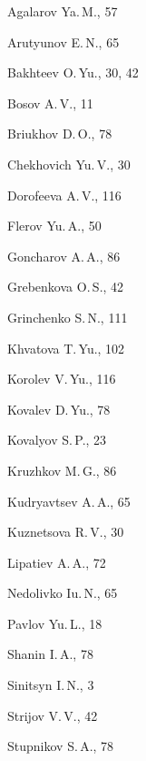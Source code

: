 \begin{theindex}

  \item Agalarov Ya.\,M., 57
  \item Arutyunov E.\,N., 65

  \indexspace

  \item Bakhteev O.\,Yu., 30, 42
  \item Bosov A.\,V., 11
  \item Briukhov D.\,O., 78

  \indexspace

  \item Chekhovich Yu.\,V., 30

  \indexspace

  \item Dorofeeva A.\,V., 116

  \indexspace

  \item Flerov Yu.\,A., 50

  \indexspace

  \item Goncharov A.\,A., 86
  \item Grebenkova O.\,S., 42
  \item Grinchenko S.\,N., 111

  \indexspace

  \item Khvatova T.\,Yu., 102
  \item Korolev V.\,Yu., 116
  \item Kovalev D.\,Yu., 78
  \item Kovalyov S.\,P., 23
  \item Kruzhkov M.\,G., 86
  \item Kudryavtsev A.\,A., 65
  \item Kuznetsova R.\,V., 30

  \indexspace

  \item Lipatiev A.\,A., 72

  \indexspace

  \item Nedolivko Iu.\,N., 65

  \indexspace

  \item Pavlov Yu.\,L., 18

  \indexspace

  \item Shanin I.\,A., 78
  \item Sinitsyn I.\,N., 3
  \item Strijov V.\,V., 42
  \item Stupnikov S.\,A., 78


\end{theindex}
